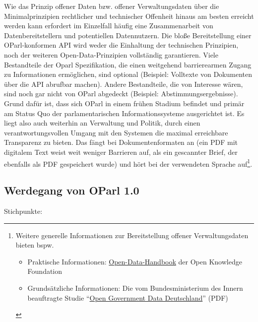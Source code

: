 \documentclass[,a4paper]{article}
\begin{document}
Wie das Prinzip offener Daten bzw. offener Verwaltungsdaten über die
Minimalprinzipien rechtlicher und technischer Offenheit hinaus am besten
erreicht werden kann erfordert im Einzelfall häufig eine Zusammenarbeit
von Datenbereitstellern und potentiellen Datennutzern. Die bloße
Bereitstellung einer OParl-konformen API wird weder die Einhaltung der
technischen Prinzipien, noch der weiteren Open-Data-Prinzipien
vollständig garantieren. Viele Bestandteile der Oparl Spezifikation, die
einen weitgehend barrierearmen Zugang zu Informationen ermöglichen, sind
optional (Beispiel: Volltexte von Dokumenten über die API abrufbar
machen). Andere Bestandteile, die von Interesse wären, sind noch gar
nicht von OParl abgedeckt (Beispiel: Abstimmungsergebnisse). Grund dafür
ist, dass sich OParl in einem frühen Stadium befindet und primär am
Status Quo der parlamentarischen Informationssysteme ausgerichtet ist.
Es liegt also auch weiterhin an Verwaltung und Politik, durch einen
verantwortungsvollen Umgang mit den Systemen die maximal erreichbare
Transparenz zu bieten. Das fängt bei Dokumentenformaten an (ein PDF mit
digitalem Text weist weit weniger Barrieren auf, als ein gescannter
Brief, der ebenfalls als PDF gespeichert wurde) und hört bei der
verwendeten Sprache auf\footnote{Weitere generelle Informationen zur
  Bereitstellung offener Verwaltungsdaten bieten bspw.

  \begin{itemize}
  \itemsep1pt\parskip0pt
  \item
    Praktische Informationen:
    \href{http://opendatahandbook.org/de/how-to-open-up-data/index.html}{Open-Data-Handbook}
    der Open Knowledge Foundation
  \item
    Grundsätzliche Informationen: Die vom Bundesministerium des Innern
    beauftragte Studie
    ``\href{http://www.bmi.bund.de/SharedDocs/Downloads/DE/Themen/OED_Verwaltung/ModerneVerwaltung/opengovernment.pdf?__blob=publicationFile}{Open
    Government Data Deutschland}'' (PDF)
  \end{itemize}}.

\subsection{Werdegang von OParl 1.0}\label{werdegang-von-oparl-1.0}

Stichpunkte:
\end{document}
